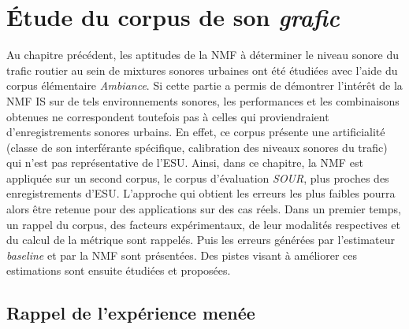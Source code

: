 
\chapter{\'Etude du corpus de son \textit{grafic}}
\label{chap:grafic}

\noindent{}

\vspace{2cm}

Au chapitre précédent, les aptitudes de la NMF à déterminer le niveau sonore du trafic routier au sein de mixtures sonores urbaines ont été étudiées avec l'aide du corpus élémentaire \textit{Ambiance}. Si cette partie a permis de démontrer l'intérêt de la NMF IS sur de tels environnements sonores, les performances et les combinaisons obtenues ne correspondent toutefois pas à celles qui proviendraient d'enregistrements sonores urbains. En effet, ce corpus présente une artificialité (classe de son interférante spécifique, calibration des niveaux sonores du trafic) qui n'est pas représentative de l'ESU. Ainsi, dans ce chapitre, la NMF est appliquée sur un second corpus, le corpus d'évaluation \textit{SOUR}, plus proches des enregistrements d'ESU. L'approche qui obtient les erreurs les plus faibles pourra alors être retenue pour des applications sur des cas réels. Dans un premier temps, un rappel du corpus, des facteurs expérimentaux, de leur modalités respectives et du calcul de la métrique sont rappelés. Puis les erreurs générées par l'estimateur \textit{baseline} et par la NMF sont présentées. Des pistes visant à améliorer ces estimations sont ensuite étudiées et proposées.

\section{Rappel de l'expérience menée}\label{part:rappelExp}
 

